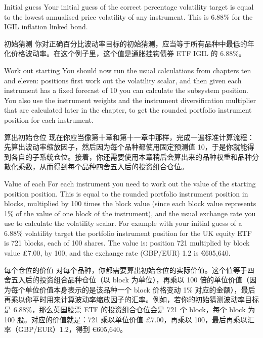 \begin{englishblock} Initial guess Your initial guess of the correct percentage volatility target is equal to the lowest annualised price volatility of any instrument. This is 6.88\% for the IGIL inflation linked bond. \end{englishblock}

\begin{chineseblock}初始猜测 你对正确百分比波动率目标的初始猜测，应当等于所有品种中最低的年化价格波动率。在这个例子里，这个值是通胀挂钩债券 ETF IGIL 的 6.88\%。 \end{chineseblock}

\bipairgap

\begin{englishblock} Work out starting You should now run the usual calculations from chapters ten and eleven: positions first work out the volatility scalar, and then given each instrument has a fixed forecast of 10 you can calculate the subsystem position. You also use the instrument weights and the instrument diversification multiplier that are calculated later in the chapter, to get the rounded portfolio instrument position for each instrument. \end{englishblock}

\begin{chineseblock}算出初始仓位 现在你应当像第十章和第十一章中那样，完成一遍标准计算流程：先算出波动率缩放因子，然后因为每个品种都使用固定预测值 10，于是你就能得到各自的子系统仓位。接着，你还需要使用本章稍后会算出来的品种权重和品种分散化乘数，从而得到每个品种四舍五入后的投资组合仓位。\end{chineseblock}

\bipairgap

\begin{englishblock} Value of each For each instrument you need to work out the value of the starting position position. This is equal to the rounded portfolio instrument position in blocks, multiplied by 100 times the block value (since each block value represents 1\% of the value of one block of the instrument), and the usual exchange rate you use to calculate the volatility scalar. For example with your initial guess of a 6.88\% volatility target the portfolio instrument position for the UK equity ETF is 721 blocks, each of 100 shares. The value is: position 721 multiplied by block value £7.00, by 100, and the exchange rate (GBP/EUR) 1.2 is €605,640. \end{englishblock}

\begin{chineseblock}每个仓位的价值 对每个品种，你都需要算出初始仓位的实际价值。这个值等于四舍五入后的投资组合品种仓位（以 block 为单位），再乘以 100 倍的单位价值（因为每个单位价值本身表示的是该品种一个 block 价格变动 1\% 对应的金额），最后再乘以你平时用来计算波动率缩放因子的汇率。例如，若你的初始猜测波动率目标是 6.88\%，那么英国股票 ETF 的投资组合仓位会是 721 个 block，每个 block 为 100 股。对应的价值就是：721 乘以单位价值 £7.00，再乘以 100，最后再乘以汇率（GBP/EUR）1.2，得到 €605,640。 \end{chineseblock}

